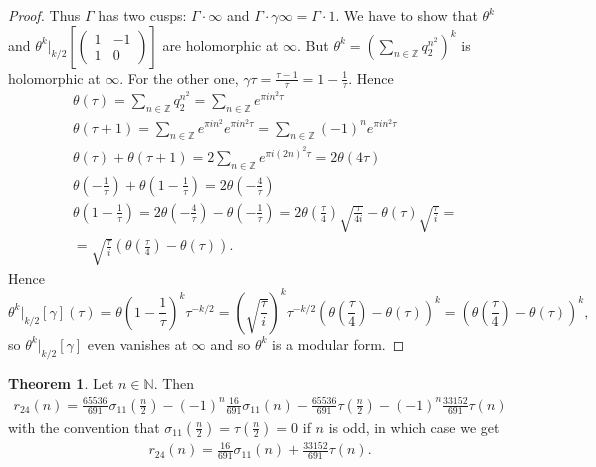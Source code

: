 \documentclass{article}
\theoremstyle{definition}
\newtheorem{theorem}{Theorem}[section]
\begin{document}
\begin{proof}
    Thus $\Gamma$ has two cusps: $\Gamma\cdot \infty$ and $\Gamma \cdot \gamma \infty = \Gamma \cdot 1$. We have to show that $\theta^k$ and $\theta^k|_{k/2}\left[\begin{pmatrix} 1&-1\\1&0 \end{pmatrix}\right]$ are holomorphic at $\infty$. But $\theta^k = \left(\sum_{n \in \mathbb{Z}}^{} q_2^{n^2}\right)^k$ is holomorphic at $\infty$. For the other one, $\gamma \tau = \frac{\tau-1}{\tau} = 1 - \frac{1}{\tau}$. Hence \begin{align*}
        &\theta(\tau) = \sum_{n \in \mathbb{Z}}^{} q_2^{n^2} = \sum_{n \in \mathbb{Z}}^{} e^{\pi i n^2 \tau}\\
        &\theta(\tau+1) = \sum_{n \in \mathbb{Z}}^{} e^{\pi i n^2}e^{\pi i n^2 \tau} = \sum_{ n \in \mathbb{Z}}^{} (-1)^n e^{\pi i n^2 \tau}\\
        &\theta(\tau)+\theta(\tau+1) = 2\sum_{n \in \mathbb{Z}}^{} e^{\pi i (2n)^2\tau} = 2 \theta(4 \tau)\\
        &\theta \left(-\frac{1}{\tau}\right) + \theta \left(1-\frac{1}{\tau}\right) = 2\theta\left(-\frac{4}{\tau}\right)\\
        &\theta \left(1-\frac{1}{\tau}\right) = 2\theta\left(-\frac{4}{\tau}\right) - \theta \left(-\frac{1}{\tau}\right) = 2\theta \left(\frac{\tau}{4}\right)\sqrt{\frac{\tau}{4i}} - \theta(\tau)\sqrt{\frac{\tau}{i}} = \\
        &= \sqrt{\frac{\tau}{i}} \left(\theta \left(\frac{\tau}{4}\right) - \theta(\tau)\right).
    \end{align*}
    Hence $$\theta^k|_{k/2}[\gamma](\tau) = \theta \left(1-\frac{1}{\tau}\right)^k \tau^{-k/2} = \left(\sqrt{\frac{\tau}{i}}\right)^{k}\tau^{-k/2} \left(\theta \left(\frac{\tau}{4}\right) - \theta(\tau) \right)^k = \left(\theta \left(\frac{\tau}{4}\right) - \theta(\tau)\right)^k,$$
    so $\theta^k|_{k/2}[\gamma]$ even vanishes at $\infty$ and so $\theta^k$ is a modular form.
\end{proof}
\begin{theorem}
    Let $n \in \mathbb{N}$. Then 
    \begin{align*}
        r_{24}(n) = \frac{65536}{691}\sigma_{11}\left(\frac{n}{2}\right) - (-1)^n \frac{16}{691}\sigma_{11}(n) - \frac{65536}{691}\tau \left(\frac{n}{2}\right) - (-1)^n \frac{33152}{691}\tau(n)
    \end{align*}
    with the convention that $\sigma_{11}\left(\frac{n}{2}\right) = \tau \left(\frac{n}{2}\right) = 0$ if $n$ is odd, in which case we get 
    \begin{align*}
        r_{24}(n) = \frac{16}{691}\sigma_{11}(n) + \frac{33152}{691}\tau(n).
    \end{align*}
\end{theorem}
\end{document}
